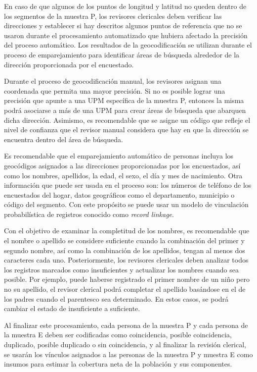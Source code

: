 \documentclass[
  12pt,
]{book}
\begin{document}
En caso de que algunos de los puntos de longitud y latitud no queden dentro de los segmentos de la muestra P, los revisores clericales deben verificar las direcciones y establecer si hay descritos algunos puntos de referencia que no se usaron durante el procesamiento automatizado que hubiera afectado la precisión del proceso automático. Los resultados de la geocodificación se utilizan durante el proceso de emparejamiento para identificar áreas de búsqueda alrededor de la dirección proporcionada por el encuestado.

Durante el proceso de geocodificación manual, los revisores asignan una coordenada que permita una mayor precisión. Si no es posible lograr una precisión que apunte a una UPM específica de la muestra P, entonces la misma podrá asociarse a más de una UPM para crear áreas de búsqueda que abarquen dicha dirección. Asimismo, es recomendable que se asigne un código que refleje el nivel de confianza que el revisor manual considera que hay en que la dirección se encuentra dentro del área de búsqueda.

Es recomendable que el emparejamiento automático de personas incluya los geocódigos asignados a las direcciones proporcionadas por los encuestados, así como los nombres, apellidos, la edad, el sexo, el día y mes de nacimiento. Otra información que puede ser usada en el proceso son: los números de teléfono de los encuestados del hogar, datos geográficos como el departamento, municipio o código del segmento. Con este propósito se puede usar un modelo de vinculación probabilística de registros conocido como \emph{record linkage}.

Con el objetivo de examinar la completitud de los nombres, es recomendable que el nombre o apellido se considere suficiente cuando la combinación del primer y segundo nombre, así como la combinación de los apellidos, tengan al menos dos caracteres cada uno. Posteriormente, los revisores clericales deben analizar todos los registros marcados como insuficientes y actualizar los nombres cuando sea posible. Por ejemplo, puede haberse registrado el primer nombre de un niño pero no su apellido, el revisor clerical podrá completar el apellido basándose en el de los padres cuando el parentesco sea determinado. En estos casos, se podrá cambiar el estado de insuficiente a suficiente.

Al finalizar este procesamiento, cada persona de la muestra P y cada persona de la muestra E deben ser codificadas como coincidencia, posible coincidencia, duplicado, posible duplicado o sin coincidencia, y al finalizar la revisión clerical, se usarán los vínculos asignados a las personas de la muestra P y muestra E como insumos para estimar la cobertura neta de la población y sus componentes.
\end{document}
